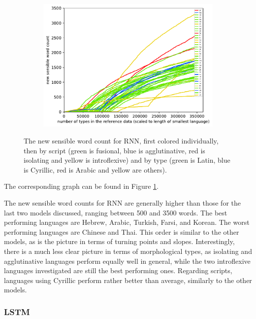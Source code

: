 \documentclass[11pt,a4paper,twoside,openright]{scrbook}
\begin{document}
\begin{figure}[h]
\begin{subfigure}[b]{0.32\textwidth}
        \includegraphics[width=\textwidth]{graphs/rnn/scripts/norm_huge_type_type_performance}
    \end{subfigure}
    \caption{The new sensible word count for RNN, first colored individually, then by script (green is fusional, blue is agglutinative, red is isolating and yellow is introflexive) and by type (green is Latin, blue is Cyrillic, red is Arabic and yellow are others).}
	\label{Figure:rnn_norm_huge_type_type_performance}
\end{figure}

The corresponding graph can be found in Figure \ref{Figure:rnn_norm_huge_type_type_performance}.

The new sensible word counts for RNN are generally higher than those for the last two models discussed, ranging between 500 and 3500 words. The best performing languages are Hebrew, Arabic, Turkish, Farsi, and Korean. The worst performing languages are Chinese and Thai. This order is similar to the other models, as is the picture in terms of turning points and slopes. Interestingly, there is a much less clear picture in terms of morphological types, as isolating and agglutinative languages perform equally well in general, while the two introflexive languages investigated are still the best performing ones. Regarding scripts, languages using Cyrillic perform rather better than average, similarly to the other models. 

\subsubsection{LSTM}
\end{document}
